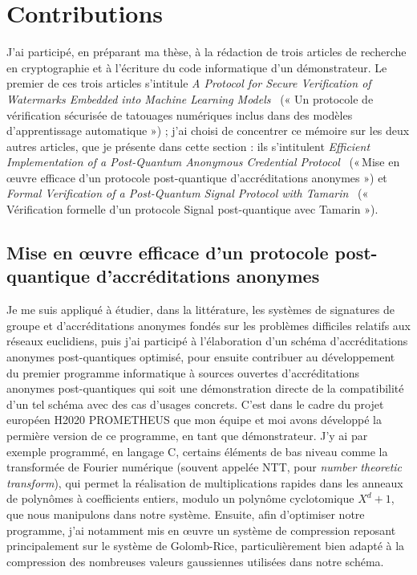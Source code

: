 
\section{Contributions} %
\label{sec:contributions}

J’ai participé, en préparant ma thèse, à la rédaction de trois articles de recherche en
cryptographie et à l’écriture du code informatique d’un démonstrateur.
Le premier de ces trois articles s’intitule \emph{A Protocol for Secure Verification of Watermarks
Embedded into Machine Learning Models}~\cite{IHMMSec:KTBBS21} (« Un protocole de vérification sécurisée de tatouages
numériques inclus dans des modèles d’apprentissage automatique ») ; j’ai choisi de concentrer ce
mémoire sur les deux autres articles, que je présente dans cette section : ils s’intitulent
\emph{Efficient Implementation of a Post-Quantum Anonymous Credential Protocol}~\cite{ARES:BCR+23}
(« Mise en œuvre efficace d’un protocole post-quantique d’accréditations anonymes ») et \emph{Formal
Verification of a Post-Quantum Signal Protocol with Tamarin}~\cite{BCRS} (« Vérification formelle
d’un protocole Signal post-quantique avec Tamarin »).


\subsection[Premier article]{Mise en œuvre efficace d’un protocole post-quantique d’accréditations anonymes~\cite{ARES:BCR+23}} %
\label{sub:paper_1}


Je me suis appliqué à étudier, dans la littérature, les systèmes de signatures de groupe et
d’accréditations anonymes fondés sur les problèmes difficiles relatifs aux réseaux euclidiens, puis 
j’ai participé à l’élaboration d’un schéma d’accréditations anonymes post-quantiques optimisé, pour
ensuite contribuer au développement du premier programme informatique à sources
ouvertes d’accréditations anonymes post-quantiques qui soit une démonstration directe de la
compatibilité d’un tel schéma avec des cas d’usages concrets.
C’est dans le cadre du projet européen H2020 PROMETHEUS que mon équipe et moi avons développé la permière version de ce programme, en tant que démonstrateur.
J’y ai par exemple programmé, en langage C, certains éléments de bas niveau comme la transformée de Fourier numérique (souvent appelée NTT, pour \textit{number theoretic transform}), qui permet la réalisation de multiplications rapides dans les anneaux de polynômes à coefficients entiers, modulo un polynôme cyclotomique $X^d + 1$, que nous manipulons dans notre système. Ensuite, afin d’optimiser notre programme, j’ai notamment mis en œuvre un système de compression reposant principalement sur le système de Golomb-Rice, particulièrement bien adapté à la compression des nombreuses valeurs gaussiennes utilisées dans notre schéma.

